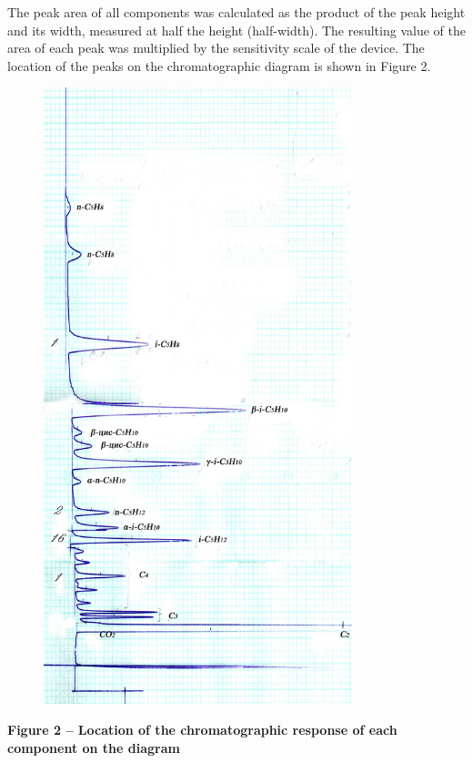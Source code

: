 The peak area of all components was calculated as the product of the
peak height and its width, measured at half the height (half-width). The
resulting value of the area of each peak was multiplied by the
sensitivity scale of the device. The location of the peaks on the
chromatographic diagram is shown in Figure 2.

\begin{figure}[H]
	\centering
	\includegraphics[width=0.8\textwidth]{assets/1054}
	\caption*{}
\end{figure}

{\bfseries Figure 2 -- Location of the chromatographic response of each
component on the diagram}

